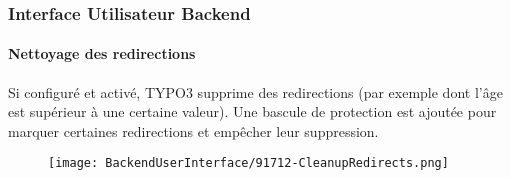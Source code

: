%

\begin{frame}[fragile]
	\frametitle{Interface Utilisateur Backend}
	\framesubtitle{Nettoyage des redirections}

	Si configuré et activé, TYPO3 supprime des redirections (par exemple dont
	l'âge est supérieur à une certaine valeur).
	Une bascule de protection est ajoutée pour marquer certaines redirections
	et empêcher leur suppression.

	\begin{figure}
		\texttt{[image: BackendUserInterface/91712-CleanupRedirects.png]}
	\end{figure}

\end{frame}

